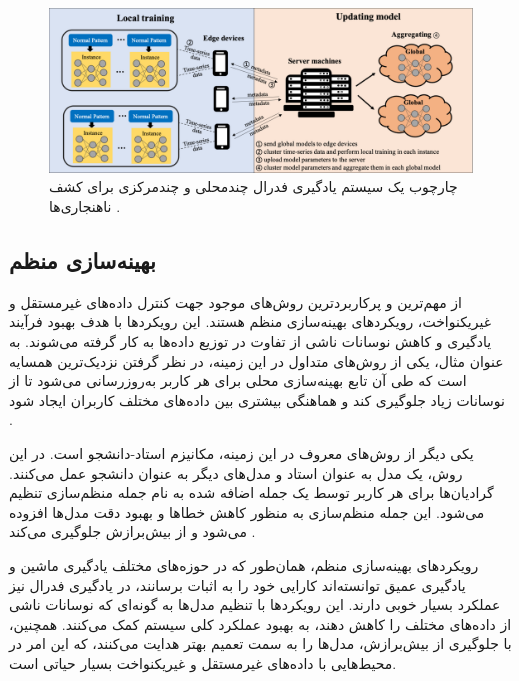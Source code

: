 \begin{figure}[t]
	\centering
	\includegraphics[scale=0.44]{images/chap3/multi_local_and_multi_global.png}%
	\caption{%
		چارچوب یک سیستم یادگیری فدرال چندمحلی و چندمرکزی برای کشف ناهنجاری‌ها 
		\cite{qin2021mlmg}%
		.
	}
	\label{multi_local_and_multi_global}
	\centering
\end{figure}


\subsection{بهینه‌سازی منظم}
از مهم‌ترین و پرکاربردترین روش‌های موجود جهت کنترل داده‌های غیرمستقل و غیریکنواخت، رویکردهای بهینه‌سازی منظم هستند. این رویکردها با هدف بهبود فرآیند یادگیری و کاهش نوسانات ناشی از تفاوت در توزیع داده‌ها به کار گرفته می‌شوند. به عنوان مثال، یکی از روش‌های متداول در این زمینه، در نظر گرفتن نزدیک‌ترین همسایه است که طی آن تابع بهینه‌سازی محلی برای هر کاربر به‌روزرسانی می‌شود تا از نوسانات زیاد جلوگیری کند و هماهنگی بیشتری بین داده‌های مختلف کاربران ایجاد شود
\cite{li2020federatedheteroneneous}.

یکی دیگر از روش‌های معروف در این زمینه، مکانیزم استاد-دانشجو%
است. در این روش، یک مدل به عنوان استاد و مدل‌های دیگر به عنوان دانشجو عمل می‌کنند. گرادیان‌ها برای هر کاربر توسط یک جمله اضافه شده به نام جمله منظم‌سازی%
تنظیم می‌شود. این جمله منظم‌سازی به منظور کاهش خطاها و بهبود دقت مدل‌ها افزوده می‌شود و از بیش‌برازش%
جلوگیری می‌کند
\cite{li2020communication}.

رویکردهای بهینه‌سازی منظم، همان‌طور که در حوزه‌های مختلف یادگیری ماشین و یادگیری عمیق توانسته‌اند کارایی خود را به اثبات برسانند، در یادگیری فدرال نیز عملکرد بسیار خوبی دارند. این رویکردها با تنظیم مدل‌ها به گونه‌ای که نوسانات ناشی از داده‌های مختلف را کاهش دهند، به بهبود عملکرد کلی سیستم کمک می‌کنند. همچنین، با جلوگیری از بیش‌برازش، مدل‌ها را به سمت تعمیم بهتر هدایت می‌کنند، که این امر در محیط‌هایی با داده‌های غیرمستقل و غیریکنواخت بسیار حیاتی است.

